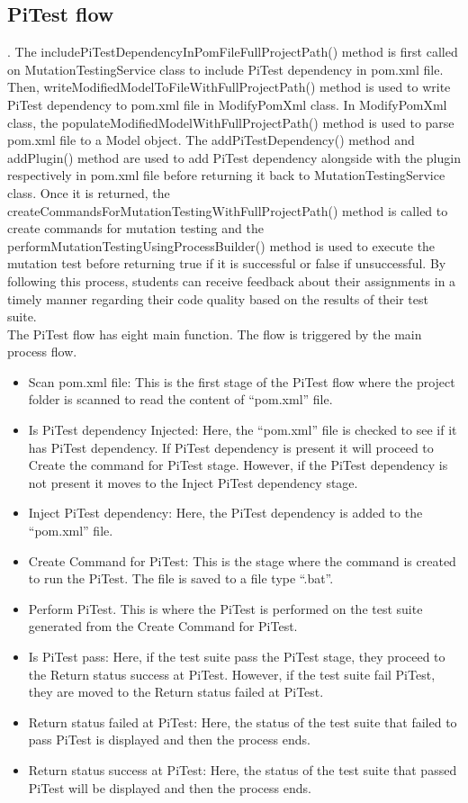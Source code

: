 \newpage
\subsection{PiTest flow}.
The includePiTestDependencyInPomFileFullProjectPath() method is first called on MutationTestingService class to include PiTest dependency in pom.xml file. Then, writeModifiedModelToFileWithFullProjectPath() method is used to write PiTest dependency to pom.xml file in ModifyPomXml class. In ModifyPomXml class, the populateModifiedModelWithFullProjectPath() method is used to parse pom.xml file to a Model object. The addPiTestDependency() method and addPlugin() method are used to add PiTest dependency alongside with the plugin respectively in pom.xml file before returning it back to MutationTestingService class. Once it is returned, the createCommandsForMutationTestingWithFullProjectPath() method is called to create commands for mutation testing and the performMutationTestingUsingProcessBuilder() method is used to execute the mutation test before returning true if it is successful or false if unsuccessful. By following this process, students can receive feedback about their assignments in a timely manner regarding their code quality based on the results of their test suite.\\
The PiTest flow has eight main function. The flow is triggered by the main process flow.
\begin{itemize}
\item Scan pom.xml file: This is the first stage of the PiTest flow where the project folder is scanned to read the content of “pom.xml” file.
\item Is PiTest dependency Injected: Here, the “pom.xml” file is checked to see if it has PiTest dependency. If PiTest dependency is present it will proceed to Create the command for PiTest stage. However, if the PiTest dependency is not present it moves to the Inject PiTest dependency stage.
\item Inject PiTest dependency: Here, the PiTest dependency is added to the “pom.xml” file.
\item Create Command for PiTest: This is the stage where the command is created to run the PiTest. The file is saved to a file type “.bat”.
\item Perform PiTest. This is where the PiTest is performed on the test suite generated from the Create Command for PiTest.
\item Is PiTest pass: Here, if the test suite pass the PiTest stage, they proceed to the Return status success at PiTest. However, if the test suite fail PiTest, they are moved to the Return status failed at PiTest.
\item Return status failed at PiTest: Here, the status of the test suite that failed to pass PiTest is displayed and then the process ends.
\item Return status success at PiTest: Here, the status of the test suite that passed PiTest will be displayed and then the process ends.
\end{itemize}
